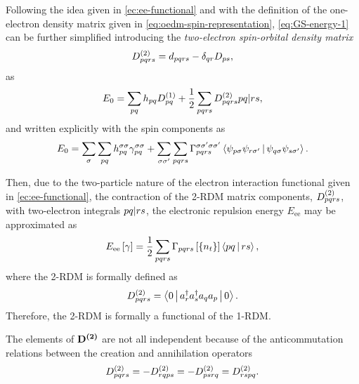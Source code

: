 Following the idea given in \cref{ec:ee-functional} and 
with the definition of the one-electron density matrix given in 
\cref{eq:oedm-spin-representation}, \cref{eq:GS-energy-1} can be further
simplified introducing the \textit{two-electron spin-orbital density matrix}
\begin{equation} \label{eq:tedm-spin-representation}
    D^{\left( 2 \right)}_{pqrs} = d_{pqrs} - \delta_{qr} D_{ps}
    ,
\end{equation}
as
\begin{equation} \label{eq:GS-energy-2}
    E_0 =
    \sum_{pq} h_{pq} \oedm_{pq} + \frac{1}{2} \sum_{pqrs}
    \tedm_{pqrs} \PBraket{pq | rs}
    ,
\end{equation}
and written explicitly with the spin components as
\begin{equation}
    E_0 = 
    \sum_{\sigma}  \sum_{pq} 
    h_{pq}^{\sigma \sigma} \fordm_{pq}^{\sigma \sigma}
    +
    \sum_{\sigma \sigma^{\prime}} \sum_{pqrs}
    \sordm_{pqrs}^{\sigma \sigma^{\prime} \sigma \sigma^{\prime}}
    \Braket{\psi_{p \sigma} \psi_{r \sigma^{\prime}} | \psi_{q \sigma} \psi_{s \sigma^{\prime}}}
    .
\end{equation}

Then, due to the two-particle nature of the electron interaction functional
given in \cref{ec:ee-functional}, the contraction of the 2-RDM matrix components,
$D^{\left( 2 \right)}_{pqrs}$, with two-electron integrals $\PBraket{pq | rs}$, the
electronic repulsion energy $E_{\text{ee}}$ may be approximated as
\begin{equation} \label{eq:Eee_from_Gamma}
    E_{\text{ee}} \left[ \fordm \right]
    =
    \frac{1}{2} \sum_{pqrs}
    \sordm_{pqrs}\left[ \left\{ n_t \right\} \right] 
    \Braket{pq | rs}
    ,
\end{equation}
where the 2-RDM is formally defined as 
\begin{equation}
    \tedm_{pqrs} = \Braket{0 | a_r^{\dagger} a_s^{\dagger} a_q a_p | 0}
    .
\end{equation}
Therefore, the 2-RDM is formally a functional of the 1-RDM. %

The elements of $ \boldsymbol{\mathrm{D^{\left( 2 \right)}}}$ are not all independent because of the
anticommutation relations between the creation and annihilation operators 
\begin{equation}
    D^{\left( 2 \right)}_{pqrs} = - D^{\left( 2 \right)}_{rqps} = - D^{\left( 2 \right)}_{ps rq} = D^{\left( 2 \right)}_{rspq}
    .
\end{equation}


